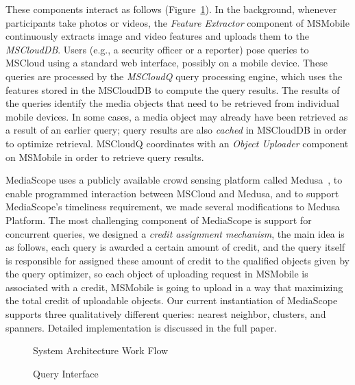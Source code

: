 \documentclass{sig-alt-release2}
\begin{document}
These components interact as follows
(Figure~\ref{fig:architecture}).
%
In the background, whenever participants take photos or videos,
the \emph{Feature Extractor} component of MSMobile continuously
extracts image and video features and uploads them to the
\emph{MSCloudDB}.
%
Users (e.g., a security officer or a reporter) pose queries to
MSCloud using a standard web interface, possibly on a mobile
device.
%
These queries are processed by the \emph{MSCloudQ} query
processing engine, which uses the features stored in the MSCloudDB
to compute the query results.
%
The results of the queries identify the media objects that need to
be retrieved from individual mobile devices.
%
In some cases, a media object may already have been retrieved as a
result of an earlier query; query results are also \emph{cached}
in MSCloudDB in order to optimize retrieval.
%
MSCloudQ coordinates with an \emph{Object Uploader} component on
MSMobile in order to retrieve query results.

MediaScope uses a publicly available crowd sensing platform called
Medusa~\cite{Medusa}, to enable programmed interaction between
MSCloud and Medusa, and to support MediaScope's timeliness
requirement, we made several modifications to Medusa Platform.
%
The most challenging component of MediaScope is support for
concurrent queries, we designed a \emph{credit assignment
mechanism}, the main idea is as follows, each query is awarded a
certain amount of credit, and the query itself is responsible for
assigned these amount of credit to the qualified objects given by
the query optimizer, so each object of uploading request in
MSMobile is associated with a credit, MSMobile is going to upload
in a way that maximizing the total credit of uploadable objects.
%
Our current instantiation of MediaScope supports three
qualitatively different queries: nearest neighbor, clusters, and
spanners. Detailed implementation is discussed in the full paper.

\begin{figure}
\centering {} \caption{System Architecture Work Flow}
\label{fig:architecture}
\vspace{-0.6cm}
\end{figure}

\begin{figure}
\centering {} \caption{Query Interface} \label{fig:interface}
\vspace{-0.8cm}
\end{figure}
\vspace{-0.3cm}
\end{document}
